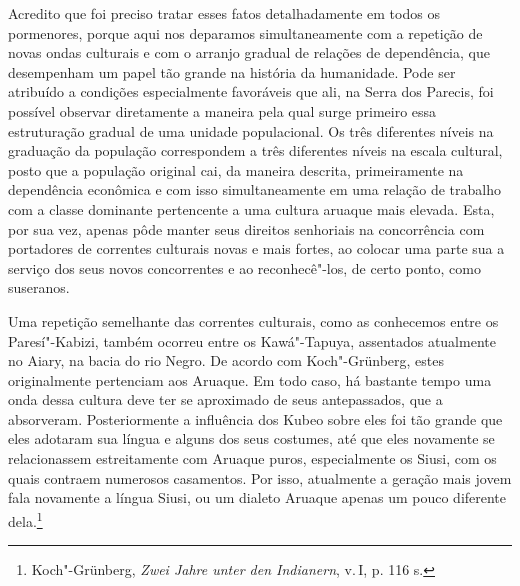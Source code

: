 Acredito que foi preciso tratar esses fatos detalhadamente em todos os
pormenores, porque aqui nos deparamos simultaneamente com a repetição
de novas ondas culturais e com o arranjo gradual de relações de
dependência, que desempenham um papel tão grande na história da
humanidade. Pode ser atribuído a condições especialmente favoráveis que
ali, na Serra dos Parecis, foi possível observar diretamente a maneira
pela qual surge primeiro essa estruturação gradual de uma unidade
populacional. Os três diferentes níveis na graduação da população
correspondem a três diferentes níveis na escala cultural, posto que a
população original cai, da maneira descrita, primeiramente na
dependência econômica e com isso simultaneamente em uma relação de
trabalho com a classe dominante pertencente a uma cultura aruaque mais
elevada. Esta, por sua vez, apenas pôde manter seus direitos senhoriais
na concorrência com portadores de correntes culturais novas e mais
fortes, ao colocar uma parte sua a serviço dos seus novos concorrentes e
ao reconhecê"-los, de certo ponto, como suseranos.

Uma repetição semelhante das correntes culturais, como as conhecemos
entre os Paresí"-Kabizi, também ocorreu entre os Kawá"-Tapuya, assentados
atualmente no Aiary, na bacia do rio Negro. De acordo com Koch"-Grünberg,
estes originalmente pertenciam aos Aruaque. Em todo caso, há bastante
tempo uma onda dessa cultura deve ter se aproximado de seus
antepassados, que a absorveram. Posteriormente a influência dos Kubeo
sobre eles foi tão grande que eles adotaram sua língua e alguns dos seus
costumes, até que eles novamente se relacionassem estreitamente com
Aruaque puros, especialmente os Siusi, com os quais contraem numerosos
casamentos. Por isso, atualmente a geração mais jovem fala novamente a
língua Siusi, ou um dialeto Aruaque apenas um pouco diferente
dela.\footnote{Koch"-Grünberg, \emph{Zwei Jahre unter den Indianern}, v.\,\textsc{I}, p. 116 s.}

